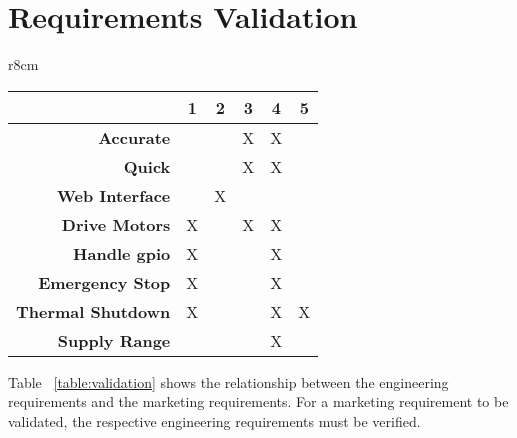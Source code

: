 \section{Requirements Validation}
\begin{wraptable}{r}{8cm}
	\vspace{-18pt}
	\caption{Engineering Requirements Validation}
	\label{table:validation}
	\centering
	\begin{tabular}{|r|c|c|c|c|c|} 
		\hline\hline
		&1&2&3&4&5\\
		\hline
		\textbf{Accurate} &  & & X & X & \\
		\hline
		\textbf{Quick} &  & & X & X & \\
		\hline
		\textbf{Web Interface} & & X & & & \\
		\hline
		\textbf{Drive Motors} & X & & X & X & \\
		\hline
		\textbf{Handle \gls{gpio}} & X & & & X & \\
		\hline
		\textbf{Emergency Stop} & X & & & X & \\
		\hline
		\textbf{Thermal Shutdown } & X & & & X & X \\
		\hline
		\textbf{Supply Range} & & & & X & \\
	\hline 
	\end{tabular}
\end{wraptable}

Table ~\ref{table:validation} shows the relationship between the engineering requirements and the marketing requirements.
For a marketing requirement to be validated, the respective engineering requirements must be verified.
